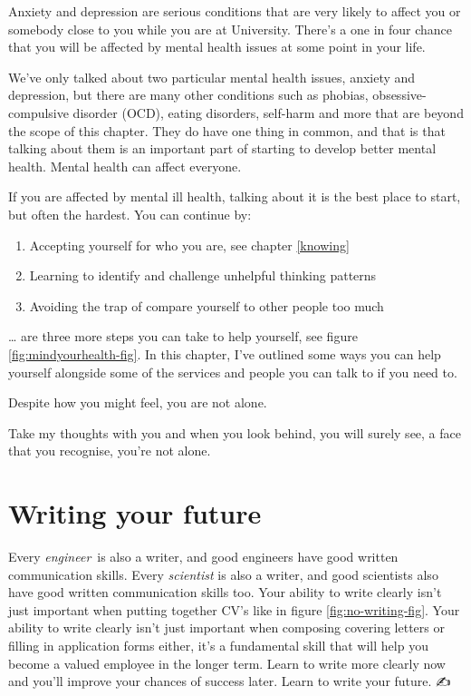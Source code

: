 \documentclass[
]{book}
\providecommand{\tightlist}{%
  \setlength{\itemsep}{0pt}\setlength{\parskip}{0pt}}
\begin{document}
Anxiety and depression are serious conditions that are very likely to affect you or somebody close to you while you are at University. There's a one in four chance that you will be affected by mental health issues at some point in your life.

We've only talked about two particular mental health issues, anxiety and depression, but there are many other conditions such as phobias, obsessive-compulsive disorder (OCD), eating disorders, self-harm and more that are beyond the scope of this chapter. They do have one thing in common, and that is that talking about them is an important part of starting to develop better mental health. Mental health can affect everyone.

If you are affected by mental ill health, talking about it is the best place to start, but often the hardest. You can continue by:

\begin{enumerate}
\def\labelenumi{\arabic{enumi}.}
\tightlist
\item
  Accepting yourself for who you are, see chapter \ref{knowing}
\item
  Learning to identify and challenge unhelpful thinking patterns
\item
  Avoiding the trap of compare yourself to other people too much
\end{enumerate}

\ldots{} are three more steps you can take to help yourself, see figure \ref{fig:mindyourhealth-fig}. In this chapter, I've outlined some ways you can help yourself alongside some of the services and people you can talk to if you need to.

Despite how you might feel, you are not alone.

Take my thoughts with you and when you look behind, you will surely see, a face that you recognise, you're not alone. \citep{yourenotalone}

\hypertarget{writing}{%
\chapter{Writing your future}\label{writing}}

Every \emph{engineer}~is also a writer, and good engineers have good written communication skills. Every \emph{scientist} is also a writer, and good scientists also have good written communication skills too. Your ability to write clearly isn't just important when putting together CV's like in figure \ref{fig:no-writing-fig}. Your ability to write clearly isn't just important when composing covering letters or filling in application forms either, it's a fundamental skill that will help you become a valued employee in the longer term. Learn to write more clearly now and you'll improve your chances of success later. Learn to write your future. ✍️
\end{document}

